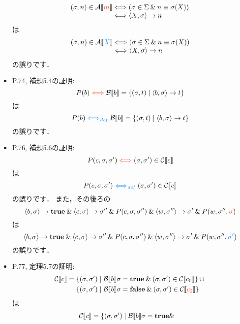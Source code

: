 \documentclass[12pt,titlepage,twoside,openright,dvipdfmx]{jsbook}
\newcommand\old[1]{%
  \textcolor[rgb]{1.0,0.25,0.1}{#1}%
  }
\newcommand\new[1]{%
  \textcolor[rgb]{0,0.55,1.0}{#1}%
  }
\theoremstyle{definition}
\begin{document}
\begin{itemize}
  \[
    \begin{array}{l@{}l}
      (\sigma, n)\in\denotation{A}{\old{m}}
      & {} \Longleftrightarrow (\sigma\in\Sigma\AND n\equiv \sigma(X)) \\
      & {} \Longleftrightarrow \tuple{X,\sigma}\rightarrow n
    \end{array}
  \]
  は
  \[
    \begin{array}{l@{}l}
      (\sigma, n)\in\denotation{A}{\new{X}}
      & {} \Longleftrightarrow (\sigma\in\Sigma\AND n\equiv \sigma(X)) \\
      & {} \Longleftrightarrow \tuple{X,\sigma}\rightarrow n
    \end{array}
  \]
  の誤りです．
\item P.74, 補題5.4の証明:
    \[
      P(b)\old{{}\Longleftrightarrow{}}
      \denotation{B}{b}=\{ (\sigma,t) \mid   \tuple{b,\sigma}\rightarrow t\}
    \]
    は
    \[
      P(b)\new{{}\Longleftrightarrow_{\mathit{def}}{}}
      \denotation{B}{b}=\{ (\sigma,t) \mid   \tuple{b,\sigma}\rightarrow t\}
    \]
    の誤りです．
  \item P.76, 補題5.6の証明:
    \[
      P(c,\sigma,\sigma')
      \old{{}\Longleftrightarrow{}}
      (\sigma,\sigma')\in\denotation{C}{c}
    \]
    は
    \[
      P(c,\sigma,\sigma')
      \new{{}\Longleftrightarrow_{\mathit{def}}{}}
      (\sigma,\sigma')\in\denotation{C}{c}
    \]
    の誤りです．
    また，その後ろの
    \[
      \tuple{b,\sigma}\rightarrow\mathbf{true}\AND
      \tuple{c,\sigma}\rightarrow\sigma''\AND
      P(c,\sigma,\sigma'') \AND
      \tuple{w,\sigma''}\rightarrow\sigma'\AND
      P(w,\sigma'',\old{\sigma})
    \]
    は
    \[
      \tuple{b,\sigma}\rightarrow\mathbf{true}\AND
      \tuple{c,\sigma}\rightarrow\sigma''\AND
      P(c,\sigma,\sigma'') \AND
      \tuple{w,\sigma''}\rightarrow\sigma'\AND
      P(w,\sigma'',\new{\sigma'})
    \]
    の誤りです．
  \item P.77, 定理5.7の証明:
    \begin{align*}
      \denotation{C}{c} = {}
      & \{(\sigma,\sigma')\mid  \denotation{B}{b}\sigma=\mathbf{true}\AND
        (\sigma,\sigma')\in\denotation{C}{c_0}\}\cup {} \\
      & \{(\sigma,\sigma')\mid  \denotation{B}{b}\sigma=\mathbf{false}\AND
        (\sigma,\sigma')\in\denotation{C}{\old{c_0}}\}  
    \end{align*}
    は
    \begin{align*}
      \denotation{C}{c} = {}
      & \{(\sigma,\sigma')\mid  \denotation{B}{b}\sigma=\mathbf{true}\AND

\end{align*}
\end{itemize}
\end{document}
